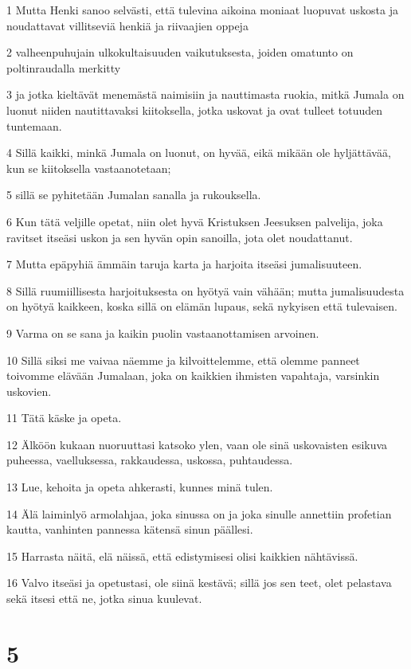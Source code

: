 \par 1 Mutta Henki sanoo selvästi, että tulevina aikoina moniaat luopuvat uskosta ja noudattavat villitseviä henkiä ja riivaajien oppeja
\par 2 valheenpuhujain ulkokultaisuuden vaikutuksesta, joiden omatunto on poltinraudalla merkitty
\par 3 ja jotka kieltävät menemästä naimisiin ja nauttimasta ruokia, mitkä Jumala on luonut niiden nautittavaksi kiitoksella, jotka uskovat ja ovat tulleet totuuden tuntemaan.
\par 4 Sillä kaikki, minkä Jumala on luonut, on hyvää, eikä mikään ole hyljättävää, kun se kiitoksella vastaanotetaan;
\par 5 sillä se pyhitetään Jumalan sanalla ja rukouksella.
\par 6 Kun tätä veljille opetat, niin olet hyvä Kristuksen Jeesuksen palvelija, joka ravitset itseäsi uskon ja sen hyvän opin sanoilla, jota olet noudattanut.
\par 7 Mutta epäpyhiä ämmäin taruja karta ja harjoita itseäsi jumalisuuteen.
\par 8 Sillä ruumiillisesta harjoituksesta on hyötyä vain vähään; mutta jumalisuudesta on hyötyä kaikkeen, koska sillä on elämän lupaus, sekä nykyisen että tulevaisen.
\par 9 Varma on se sana ja kaikin puolin vastaanottamisen arvoinen.
\par 10 Sillä siksi me vaivaa näemme ja kilvoittelemme, että olemme panneet toivomme elävään Jumalaan, joka on kaikkien ihmisten vapahtaja, varsinkin uskovien.
\par 11 Tätä käske ja opeta.
\par 12 Älköön kukaan nuoruuttasi katsoko ylen, vaan ole sinä uskovaisten esikuva puheessa, vaelluksessa, rakkaudessa, uskossa, puhtaudessa.
\par 13 Lue, kehoita ja opeta ahkerasti, kunnes minä tulen.
\par 14 Älä laiminlyö armolahjaa, joka sinussa on ja joka sinulle annettiin profetian kautta, vanhinten pannessa kätensä sinun päällesi.
\par 15 Harrasta näitä, elä näissä, että edistymisesi olisi kaikkien nähtävissä.
\par 16 Valvo itseäsi ja opetustasi, ole siinä kestävä; sillä jos sen teet, olet pelastava sekä itsesi että ne, jotka sinua kuulevat.

\chapter{5}

